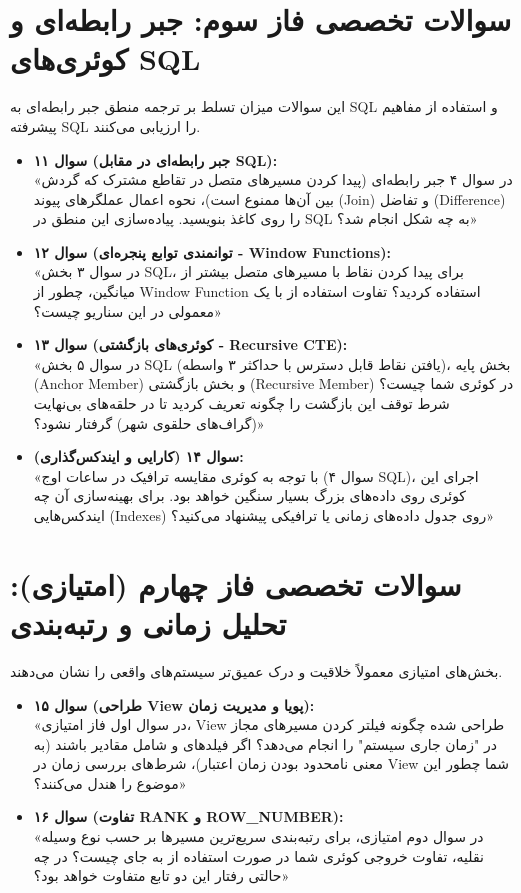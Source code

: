 \documentclass[12pt]{article}
\begin{document}
\section{سوالات تخصصی فاز سوم: جبر رابطه‌ای و کوئری‌های SQL}
این سوالات میزان تسلط بر ترجمه منطق جبر رابطه‌ای به SQL و استفاده از مفاهیم پیشرفته SQL را ارزیابی می‌کنند.
\begin{itemize}[label=$\bullet$, leftmargin=*]
    \item \textbf{سوال ۱۱ (جبر رابطه‌ای در مقابل SQL):} \\
    «در سوال ۴ جبر رابطه‌ای (پیدا کردن مسیرهای متصل در تقاطع مشترک که گردش بین آن‌ها ممنوع است)، نحوه اعمال عملگرهای پیوند (Join) و تفاضل (Difference) را روی کاغذ بنویسید. پیاده‌سازی این منطق در SQL به چه شکل انجام شد؟»
    \item \textbf{سوال ۱۲ (توانمندی توابع پنجره‌ای - Window Functions):} \\
    «در سوال ۳ بخش SQL، برای پیدا کردن نقاط با مسیرهای متصل بیشتر از میانگین، چطور از Window Function استفاده کردید؟ تفاوت استفاده از  با یک  معمولی در این سناریو چیست؟»
    \item \textbf{سوال ۱۳ (کوئری‌های بازگشتی - Recursive CTE):} \\
    «در سوال ۵ بخش SQL (یافتن نقاط قابل دسترس با حداکثر ۳ واسطه)، بخش پایه (Anchor Member) و بخش بازگشتی (Recursive Member) در کوئری شما چیست؟ شرط توقف این بازگشت را چگونه تعریف کردید تا در حلقه‌های بی‌نهایت (گراف‌های حلقوی شهر) گرفتار نشود؟»
    \item \textbf{سوال ۱۴ (کارایی و ایندکس‌گذاری):} \\
    «با توجه به کوئری مقایسه ترافیک در ساعات اوج (سوال ۴ SQL)، اجرای این کوئری روی داده‌های بزرگ بسیار سنگین خواهد بود. برای بهینه‌سازی آن چه ایندکس‌هایی (Indexes) روی جدول داده‌های زمانی یا ترافیکی پیشنهاد می‌کنید؟»
\end{itemize}

\section{سوالات تخصصی فاز چهارم (امتیازی): تحلیل زمانی و رتبه‌بندی}
بخش‌های امتیازی معمولاً خلاقیت و درک عمیق‌تر سیستم‌های واقعی را نشان می‌دهند.
\begin{itemize}[label=$\bullet$, leftmargin=*]
    \item \textbf{سوال ۱۵ (طراحی View پویا و مدیریت زمان):} \\
    «در سوال اول فاز امتیازی، View طراحی شده چگونه فیلتر کردن مسیرهای مجاز در "زمان جاری سیستم" را انجام می‌دهد؟ اگر فیلدهای  و  شامل مقادیر  باشند (به معنی نامحدود بودن زمان اعتبار)، شرط‌های بررسی زمان در View شما چطور این موضوع را هندل می‌کنند؟»
    \item \textbf{سوال ۱۶ (تفاوت RANK و ROW\_NUMBER):} \\
    «در سوال دوم امتیازی، برای رتبه‌بندی سریع‌ترین مسیرها بر حسب نوع وسیله نقلیه، تفاوت خروجی کوئری شما در صورت استفاده از  به جای  چیست؟ در چه حالتی رفتار این دو تابع متفاوت خواهد بود؟»
\end{itemize}
\end{document}
